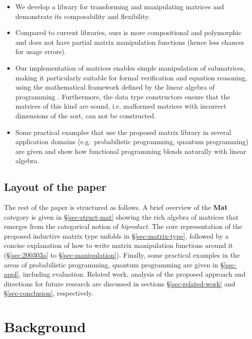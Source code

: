 \documentclass[sigplan]{acmart}\settopmatter{}
\def\doc{paper}
\begin{document}
\begin{itemize}
    \item We develop a library for transforming and manipulating matrices and demonstrate its composability and flexibility.
    \item Compared to current libraries, ours is more compositional and polymorphic and does not have partial matrix manipulation functions (hence less chances for usage errors). 
    \item Our implementation of matrices enables simple manipulation of submatrices, making it particularly suitable for formal verification and equation reasoning, using the mathematical framework defined by the linear algebra of programming \citep{oliveira2012towards}. Furthermore, the data type constructors ensure that the matrices of this kind are sound, i.e. malformed matrices with incorrect dimensions of the sort, can not be constructed.
    \item Some practical examples that use the proposed matrix library in several application domains (e.g.\ probabilistic programming, quantum programming) are given and show how functional programming blends naturally with linear algebra. 
\end{itemize}{}

\subsection{Layout of the \doc}

The rest of the paper is structured as follows. A brief overview of the \textbf{Mat} category is given in \S\ref{sec-struct-mat} showing the rich algebra of matrices that emerges from the categorical notion of \emph{biproduct}.
The core representation of the proposed inductive matrix type unfolds in \S\ref{sec-matrix-type}, followed by a concise explanation of how to write matrix manipulation functions around it (\S\ref{sec:200303a} to \S\ref{sec-manipulation}). Finally, some practical examples in the areas of probabilistic programming, quantum programming are given in \S\ref{sec-appl}, including evaluation. Related work, analysis of the proposed approach and directions for future research are discussed in sections \S\ref{sec-related-work} and \S\ref{sec-conclusion}, respectively.

\section{Background}\label{sec-motivation}
\end{document}
